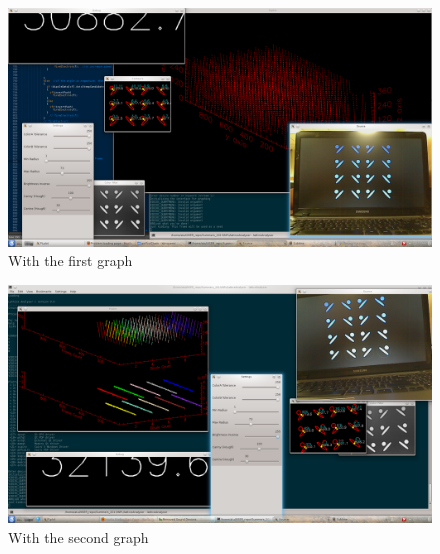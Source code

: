 			\begin{figure}[bth]
				\begin{center}
					\includegraphics[width=1.1\linewidth]{../../latticeAnalyser/screenshots/snapshot8.png}
				\end{center}
			\caption[With the first graph]{With the first graph}
			\label{snapshot8}
			\end{figure}

			\begin{figure}[bth]
				\begin{center}
					\includegraphics[width=1.1\linewidth]{../../latticeAnalyser/screenshots/snapshot9.png}
				\end{center}
			\caption[With the second graph]{With the second graph}
			\label{snapshot9}
			\end{figure}

